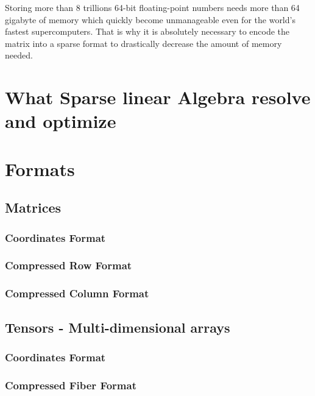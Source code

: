 Storing more than 8 trillions 64-bit floating-point numbers needs more than 64 gigabyte of memory which quickly become unmanageable even for the world's fastest supercomputers. That is why it is absolutely necessary to encode the matrix into a sparse format to drastically decrease the amount of memory needed.


\section{What Sparse linear Algebra resolve and optimize}





\section{Formats}
\subsection{Matrices}
\subsubsection{Coordinates Format}
\subsubsection{Compressed Row Format}
\subsubsection{Compressed Column Format}
\subsection{Tensors - Multi-dimensional arrays}
\subsubsection{Coordinates Format}
\subsubsection{Compressed Fiber Format}
